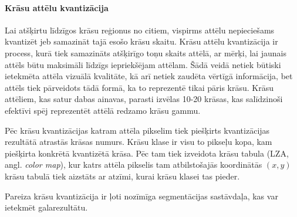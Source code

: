 \documentclass[12pt,paper=a4]{report}
\begin{document}
\paragraph{Krāsu attēlu kvantizācija}Lai atšķirtu līdzīgos krāsu reģionus no citiem, vispirms attēlu nepieciešams kvantizēt jeb samazināt tajā esošo krāsu skaitu. Krāsu attēlu kvantizācija ir process, kurā tiek samazināts atšķirīgo toņu skaits attēlā, ar mērķi, lai jaunais attēls būtu maksimāli līdzīgs iepriekšējam attēlam. Šādā veidā netiek būtiski ietekmēta attēla vizuālā kvalitāte, kā arī netiek zaudēta vērtīgā informācija, bet attēls tiek pārveidots tādā formā, ka to reprezentē tikai pāris krāsu. Krāsu attēliem, kas satur dabas ainavas, parasti izvēlas 10-20 krāsas, kas salīdzinoši efektīvi spēj reprezentēt attēlā redzamo krāsu gammu.\cite{1colImSegm1999}\par
Pēc krāsu kvantizācijas katram attēla pikselim tiek piešķirts kvantizācijas rezultātā atrastās krāsas numurs. Krāsu klase ir visu to pikseļu kopa, kam piešķirta konkrētā kvantizētā krāsa. Pēc tam tiek izveidota krāsu tabula (LZA, angl. \textit{color map}), kur katrs attēla pikselis tam atbilstošajās koordinātās $(x,y)$ krāsu tabulā tiek aizstāts ar atzīmi, kurai krāsu klasei tas pieder.\cite{1colImSegm1999}\par
Pareiza krāsu kvantizācija ir ļoti nozīmīga segmentācijas sastāvdaļa, kas var ietekmēt galarezultātu.
\end{document}
